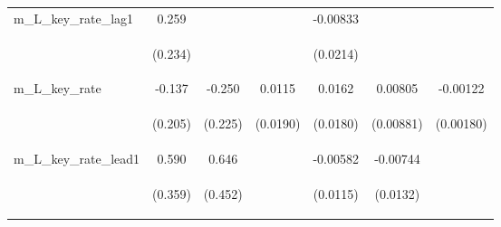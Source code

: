 \documentclass[]{article}
\begin{document}
\begin{center}
\begin{tabular}{lcccccc}
m\_L\_key\_rate\_lag1 & 0.259 &  &  & -0.00833 &  &  \\
\vspace{4pt} & \begin{footnotesize}(0.234)\end{footnotesize} & \begin{footnotesize}\end{footnotesize} & \begin{footnotesize}\end{footnotesize} & \begin{footnotesize}(0.0214)\end{footnotesize} & \begin{footnotesize}\end{footnotesize} & \begin{footnotesize}\end{footnotesize} \\
m\_L\_key\_rate & -0.137 & -0.250 & 0.0115 & 0.0162 & 0.00805 & -0.00122 \\
\vspace{4pt} & \begin{footnotesize}(0.205)\end{footnotesize} & \begin{footnotesize}(0.225)\end{footnotesize} & \begin{footnotesize}(0.0190)\end{footnotesize} & \begin{footnotesize}(0.0180)\end{footnotesize} & \begin{footnotesize}(0.00881)\end{footnotesize} & \begin{footnotesize}(0.00180)\end{footnotesize} \\
m\_L\_key\_rate\_lead1 & 0.590 & 0.646 &  & -0.00582 & -0.00744 &  \\
\vspace{4pt} & \begin{footnotesize}(0.359)\end{footnotesize} & \begin{footnotesize}(0.452)\end{footnotesize} & \begin{footnotesize}\end{footnotesize} & \begin{footnotesize}(0.0115)\end{footnotesize} & \begin{footnotesize}(0.0132)\end{footnotesize} & \begin{footnotesize}\end{footnotesize} \\

\end{tabular}
\end{center}
\end{document}
